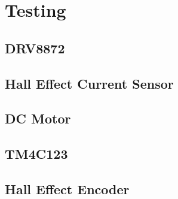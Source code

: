 \section{Testing}
\subsection{DRV8872}
\subsection{Hall Effect Current Sensor}
\subsection{DC Motor}
\subsection{TM4C123}
\subsection{Hall Effect Encoder}

